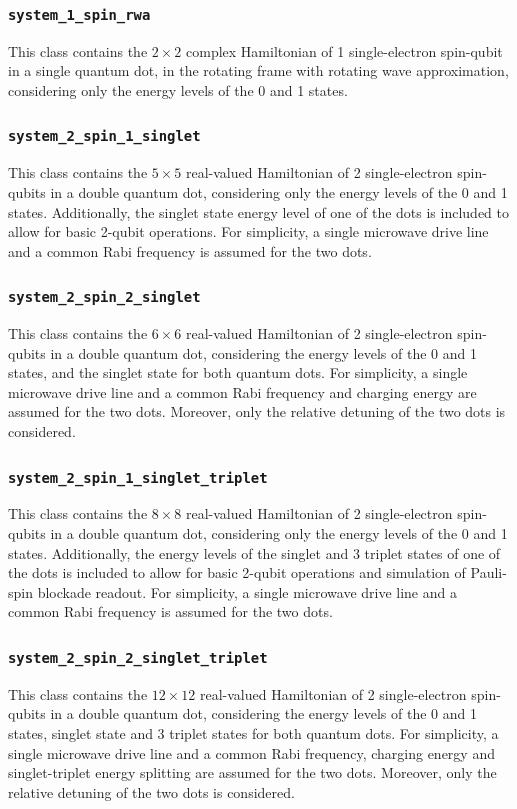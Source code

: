 \documentclass[10pt,a4paper,onecolumn,notitlepage]{article}
\begin{document}
\subsubsection{\lstinline{system_1_spin_rwa}}
This class contains the $2\times2$ complex Hamiltonian of 1 single-electron spin-qubit in a single quantum dot, in the rotating frame with rotating wave approximation, considering only the energy levels of the 0 and 1 states.

\subsubsection{\lstinline{system_2_spin_1_singlet}}
This class contains the $5\times5$ real-valued Hamiltonian of 2 single-electron spin-qubits in a double quantum dot, considering only the energy levels of the 0 and 1 states. Additionally, the singlet state energy level of one of the dots is included to allow for basic 2-qubit operations. For simplicity, a single microwave drive line and a common Rabi frequency is assumed for the two dots.

\subsubsection{\lstinline{system_2_spin_2_singlet}}
This class contains the $6\times6$ real-valued Hamiltonian of 2 single-electron spin-qubits in a double quantum dot, considering the energy levels of the 0 and 1 states, and the singlet state for both quantum dots. For simplicity, a single microwave drive line and a common Rabi frequency and charging energy are assumed for the two dots. Moreover, only the relative detuning of the two dots is considered.

\subsubsection{\lstinline{system_2_spin_1_singlet_triplet}}
This class contains the $8\times8$ real-valued Hamiltonian of 2 single-electron spin-qubits in a double quantum dot, considering only the energy levels of the 0 and 1 states. Additionally, the energy levels of the singlet and 3 triplet states of one of the dots is included to allow for basic 2-qubit operations and simulation of Pauli-spin blockade readout. For simplicity, a single microwave drive line and a common Rabi frequency is assumed for the two dots.

\subsubsection{\lstinline{system_2_spin_2_singlet_triplet}}
This class contains the $12\times12$ real-valued Hamiltonian of 2 single-electron spin-qubits in a double quantum dot, considering the energy levels of the 0 and 1 states, singlet state and 3 triplet states for both quantum dots. For simplicity, a single microwave drive line and a common Rabi frequency, charging energy and singlet-triplet energy splitting are assumed for the two dots. Moreover, only the relative detuning of the two dots is considered.
\end{document}
